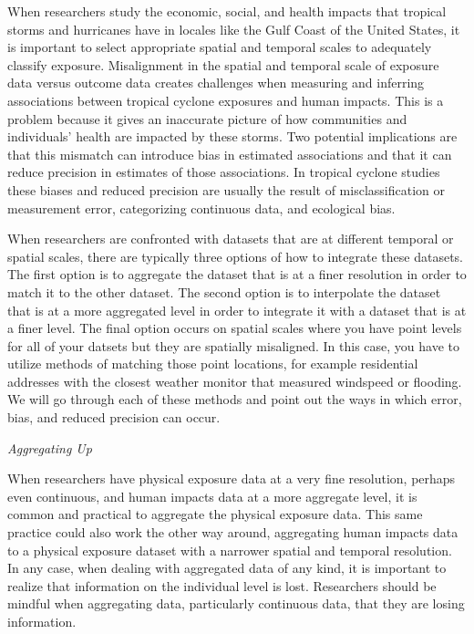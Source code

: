 \documentclass[]{article}
\begin{document}
When researchers study the economic, social, and health impacts that
tropical storms and hurricanes have in locales like the Gulf Coast of
the United States, it is important to select appropriate spatial and
temporal scales to adequately classify exposure. Misalignment in the
spatial and temporal scale of exposure data versus outcome data creates
challenges when measuring and inferring associations between tropical
cyclone exposures and human impacts. This is a problem because it gives
an inaccurate picture of how communities and individuals' health are
impacted by these storms. Two potential implications are that this
mismatch can introduce bias in estimated associations and that it can
reduce precision in estimates of those associations. In tropical cyclone
studies these biases and reduced precision are usually the result of
misclassification or measurement error, categorizing continuous data,
and ecological bias.

When researchers are confronted with datasets that are at different
temporal or spatial scales, there are typically three options of how to
integrate these datasets. The first option is to aggregate the dataset
that is at a finer resolution in order to match it to the other dataset.
The second option is to interpolate the dataset that is at a more
aggregated level in order to integrate it with a dataset that is at a
finer level. The final option occurs on spatial scales where you have
point levels for all of your datsets but they are spatially misaligned.
In this case, you have to utilize methods of matching those point
locations, for example residential addresses with the closest weather
monitor that measured windspeed or flooding. We will go through each of
these methods and point out the ways in which error, bias, and reduced
precision can occur.

\emph{Aggregating Up}

When researchers have physical exposure data at a very fine resolution,
perhaps even continuous, and human impacts data at a more aggregate
level, it is common and practical to aggregate the physical exposure
data. This same practice could also work the other way around,
aggregating human impacts data to a physical exposure dataset with a
narrower spatial and temporal resolution. In any case, when dealing with
aggregated data of any kind, it is important to realize that information
on the individual level is lost. Researchers should be mindful when
aggregating data, particularly continuous data, that they are losing
information.
\end{document}
